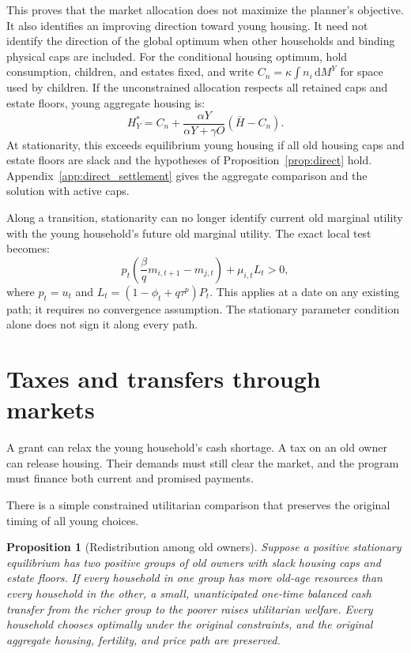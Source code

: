 \documentclass[11pt]{article}
\newtheorem{proposition}{Proposition}
\newcommand{\dd}{\mathrm d}
\begin{document}
This proves that the market allocation does not maximize the planner's
objective. It also identifies an improving direction toward young housing.
It need not identify the direction of the global optimum when other
households and binding physical caps are included. For the conditional
housing optimum, hold consumption, children, and estates fixed, and write
$C_n=\kappa\int n_i\,\dd M^Y$ for space used by children. If the unconstrained
allocation respects all retained caps and estate floors, young aggregate
housing is:
\begin{equation}
H_Y^*=C_n+\frac{\alpha Y}{\alpha Y+\gamma O}(\bar H-C_n).
\label{eq:planner_housing}
\end{equation}
At stationarity, this exceeds equilibrium young housing if all old housing
caps and estate floors are slack and the hypotheses of
Proposition~\ref{prop:direct} hold. Appendix~\ref{app:direct_settlement}
gives the aggregate comparison and the solution with active caps.

Along a transition, stationarity can no longer identify current old marginal
utility with the young household's future old marginal utility. The exact
local test becomes:
\begin{equation}
p_t\left(\frac\beta q m_{i,t+1}-m_{j,t}\right)+\mu_{i,t}L_t>0,
\label{eq:dated_gap}
\end{equation}
where $p_t=u_t$ and $L_t=(1-\phi_t+q\tau^p)P_t$. This applies at a date on
any existing path; it requires no convergence assumption. The stationary
parameter condition alone does not sign it along every path.

\section{Taxes and transfers through markets}

A grant can relax the young household's cash shortage. A tax on an old owner
can release housing. Their demands must still clear the market, and the
program must finance both current and promised payments.

There is a simple constrained utilitarian comparison that preserves the
original timing of all young choices.

\begin{proposition}[Redistribution among old owners]
\label{prop:old_redistribution}
Suppose a positive stationary equilibrium has two positive groups of old
owners with slack housing caps and estate floors. If every household in one
group has more old-age resources than every household in the other, a small,
unanticipated one-time balanced cash transfer from the richer group to the
poorer raises utilitarian welfare. Every household chooses optimally under the original constraints,
and the original aggregate housing, fertility, and price path are preserved.
\end{proposition}
\end{document}
